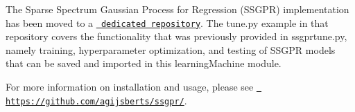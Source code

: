 The Sparse Spectrum Gaussian Process for Regression (SSGPR) implementation has been moved to a \href{https://github.com/agijsberts/ssgpr/}{\texttt{ dedicated repository}}. The {\ttfamily tune.\+py} example in that repository covers the functionality that was previously provided in {\ttfamily ssgprtune.\+py}, namely training, hyperparameter optimization, and testing of SSGPR models that can be saved and imported in this {\ttfamily learning\+Machine} module.

For more information on installation and usage, please see \href{https://github.com/agijsberts/ssgpr/}{\texttt{ https\+://github.\+com/agijsberts/ssgpr/}}. 